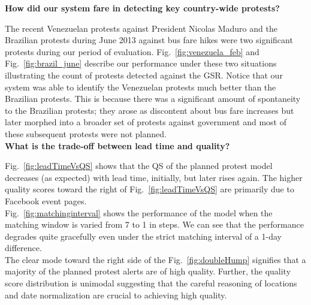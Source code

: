 \documentclass[letterpaper]{article}
\begin{document}
\noindent
{\bf How did our system fare in detecting key country-wide protests?}

The recent Venezuelan protests against President Nicolas Maduro and the
Brazilian protests during June 2013 against bus fare hikes were two
significant protests during our period of evaluation.
Fig.~\ref{fig:venezuela_feb} and Fig.~\ref{fig:brazil_june} describe our
performance under these two situations illustrating the count of
protests detected against the GSR. Notice that our system was able to
identify the Venezuelan protests much better than the Brazilian
protests. This is because there was a significant amount of spontaneity
to the Brazilian protests; they arose as discontent about bus fare
increases but later morphed into a broader set of protests against
government and most of these subsequent protests were not planned.\\

\noindent
{\bf What is the trade-off between lead time and quality?}

Fig.~\ref{fig:leadTimeVsQS} shows that the QS of the planned protest
model decreases (as expected) with lead time, initially, but later rises
again. The higher quality scores toward the right of
Fig.~\ref{fig:leadTimeVsQS} are primarily due to Facebook event pages.\\

 Fig.~\ref{fig:matchinginterval} shows the performance of the
model when the matching window is varied from 7 to 1 in steps.  We can
see that the performance degrades quite gracefully even under the strict
matching interval of a 1-day difference.\\

 The clear
mode toward the right side of the Fig.~\ref{fig:doubleHump} signifies
that a majority of the planned protest alerts are of high quality.
Further, the quality score distribution is unimodal suggesting that the
careful reasoning of locations and date normalization are crucial to
achieving high quality.
\end{document}
